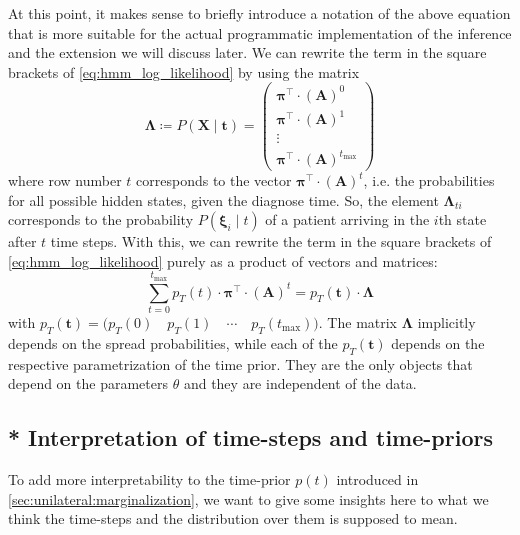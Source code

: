 \documentclass[\relativeRoot/main.tex]{subfiles}
\begin{document}
At this point, it makes sense to briefly introduce a notation of the above equation that is more suitable for the actual programmatic implementation of the inference and the extension we will discuss later. We can rewrite the term in the square brackets of \cref{eq:hmm_log_likelihood} by using the matrix
%
\begin{equation} \label{eq:hmm_matrix_lambda}
    \boldsymbol{\Lambda} \coloneqq 
    P \left( \mathbf{X} \mid \mathbf{t} \right) = 
    \begin{pmatrix}
        \boldsymbol{\pi}^\top \cdot \left( \mathbf{A} \right)^0 \\
        \boldsymbol{\pi}^\top \cdot \left( \mathbf{A} \right)^1 \\
        \vdots \\
        \boldsymbol{\pi}^\top \cdot \left( \mathbf{A} \right)^{t_\text{max}}
    \end{pmatrix}
\end{equation}
%
where row number $t$ corresponds to the vector $\boldsymbol{\pi}^\top \cdot \left( \mathbf{A} \right)^t$, i.e. the probabilities for all possible hidden states, given the diagnose time. So, the element $\boldsymbol{\Lambda}_{ti}$ corresponds to the probability $P \left( \boldsymbol{\xi}_i \mid t \right)$ of a patient arriving in the $i$th state after $t$ time steps. With this, we can rewrite the term in the square brackets of \cref{eq:hmm_log_likelihood} purely as a product of vectors and matrices:
%
\begin{equation}
    \sum_{t = 0}^{t_\text{max}}{p_T (t) \cdot \boldsymbol{\pi}^\top \cdot (\mathbf{A})^t} = p_T \left( \mathbf{t} \right) \cdot \boldsymbol{\Lambda}
\end{equation}
%
with $p_T \left( \mathbf{t} \right) = \big( p_T(0) \quad p_T(1) \quad \cdots \quad p_T(t_\text{max}) \big)$. The matrix $\boldsymbol{\Lambda}$ implicitly depends on the spread probabilities, while each of the $p_T(\mathbf{t})$ depends on the respective parametrization of the time prior. They are the only objects that depend on the parameters $\theta$ and they are independent of the data.


\subsection{* Interpretation of time-steps and time-priors}
\label{subsec:unilateral:tstage:interpretation}

To add more interpretability to the time-prior $p(t)$ introduced in \cref{sec:unilateral:marginalization}, we want to give some insights here to what we think the time-steps and the distribution over them is supposed to mean.
\end{document}
